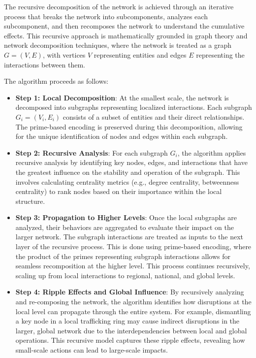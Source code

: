 \documentclass[%
 preprint, linenumbers,
 amsmath,amssymb,
 aps, physrev,
]{revtex4-2}
\begin{document}
The recursive decomposition of the network is achieved through an iterative process that breaks the network into subcomponents, analyzes each subcomponent, and then recomposes the network to understand the cumulative effects. This recursive approach is mathematically grounded in graph theory and network decomposition techniques, where the network is treated as a graph \( G = (V, E) \), with vertices \( V \) representing entities and edges \( E \) representing the interactions between them.

The algorithm proceeds as follows:

\begin{itemize}
    \item \textbf{Step 1: Local Decomposition}: At the smallest scale, the network is decomposed into subgraphs representing localized interactions. Each subgraph \( G_i = (V_i, E_i) \) consists of a subset of entities and their direct relationships. The prime-based encoding is preserved during this decomposition, allowing for the unique identification of nodes and edges within each subgraph.
    \item \textbf{Step 2: Recursive Analysis}: For each subgraph \( G_i \), the algorithm applies recursive analysis by identifying key nodes, edges, and interactions that have the greatest influence on the stability and operation of the subgraph. This involves calculating centrality metrics (e.g., degree centrality, betweenness centrality) to rank nodes based on their importance within the local structure. 
    \item \textbf{Step 3: Propagation to Higher Levels}: Once the local subgraphs are analyzed, their behaviors are aggregated to evaluate their impact on the larger network. The subgraph interactions are treated as inputs to the next layer of the recursive process. This is done using prime-based encoding, where the product of the primes representing subgraph interactions allows for seamless recomposition at the higher level. This process continues recursively, scaling up from local interactions to regional, national, and global levels.
    \item \textbf{Step 4: Ripple Effects and Global Influence}: By recursively analyzing and re-composing the network, the algorithm identifies how disruptions at the local level can propagate through the entire system. For example, dismantling a key node in a local trafficking ring may cause indirect disruptions in the larger, global network due to the interdependencies between local and global operations. This recursive model captures these ripple effects, revealing how small-scale actions can lead to large-scale impacts.
\end{itemize}
\end{document}
